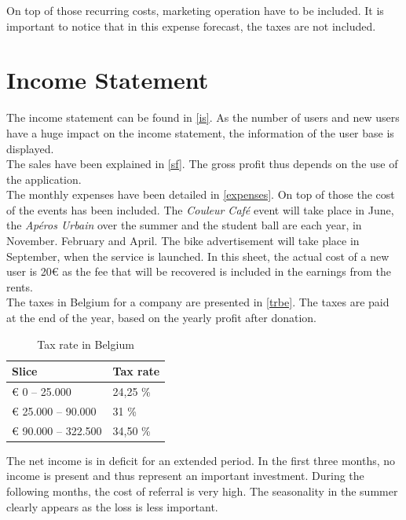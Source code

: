 \documentclass[12pt,a4paper,oneside]{book}
\begin{document}
On top of those recurring costs, marketing operation have to be included. It is important to notice that in this expense forecast, the taxes are not included.

\section{Income Statement}

The income statement can be found in \autoref{is}. As the number of users and new users have a huge impact on the income statement, the information of the user base is displayed.\\

The sales have been explained in \autoref{sf}. The gross profit thus depends on the use of the application.\\

The monthly expenses have been detailed in \autoref{expenses}. On top of those the cost of the events has been included. The \textit{Couleur Café} event will take place in June, the \textit{Apéros Urbain} over the summer and the student ball are each year, in November. February and April. The bike advertisement will take place in September, when the service is launched. In this sheet, the actual cost of a new user is 20\euro{} as the fee that will be recovered is included in the earnings from the rents.\\

The taxes in Belgium for a company are presented in \autoref{trbe}. The taxes are paid at the end of the year, based on the yearly profit after donation.

\begin{table}[ht]
\centering
\caption{Tax rate in Belgium\cite{trbe}}
\label{trbe}
\begin{tabular}{@{}ll@{}}
\toprule
\textbf{Slice}     & \textbf{Tax rate} \\ \midrule
\euro{} 0 – 25.000       & 24,25 \%          \\
\euro{} 25.000 – 90.000  & 31 \%             \\
\euro{} 90.000 – 322.500 & 34,50 \%          \\ \bottomrule
\end{tabular}
\end{table}

The net income is in deficit for an extended period. In the first three months, no income is present and thus represent an important investment. During the following months, the cost of referral is very high. The seasonality in the summer clearly appears as the loss is less important.\\
\end{document}
